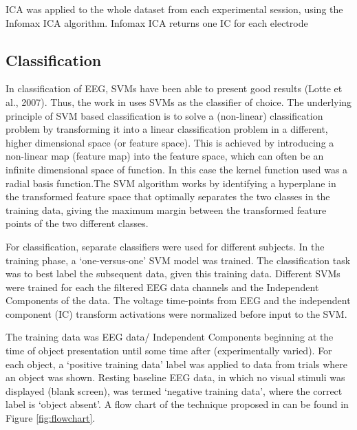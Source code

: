 \documentclass{article} %
\begin{document}
ICA was applied to the whole dataset from each experimental session, using the Infomax ICA algorithm. Infomax ICA returns one IC for each electrode

\subsection{Classification}
In classification of EEG, SVMs have been able to present good results (Lotte et al., 2007). Thus, the work in \cite{Stewart20141} uses SVMs as the classifier of choice. The underlying principle of SVM based classification is to solve
a (non-linear) classification problem by transforming it into a linear classification problem in a different, higher dimensional space (or feature space). This is achieved by introducing a non-linear map (feature map)
into the feature space, which can often be an infinite dimensional space of function. In this case the kernel function used  was a radial basis function.The SVM algorithm works by identifying a hyperplane in the transformed feature space that optimally separates the two classes in the training data, giving the maximum margin between the transformed feature points of the two different classes.

For classification, separate classifiers were used for different subjects. In the training phase, a ‘one-versus-one’ SVM model was trained. The classification task was to best label the subsequent data, given this training data. Different SVMs were trained for each the filtered EEG data channels and the Independent Components of the data. The voltage time-points from EEG and the independent component (IC) transform activations were normalized before input to the SVM.  

The training data was EEG data/ Independent Components beginning at the time of object presentation until some time after (experimentally varied). For each object, a ‘positive training data’ label was applied to data from trials where an object was shown. Resting baseline EEG data, in which no visual stimuli was displayed (blank screen), was termed ‘negative training data’, where the correct label is ‘object absent’. A flow chart of the technique proposed in \cite{Stewart20141} can be found in Figure \ref{fig:flowchart}.
\end{document}

